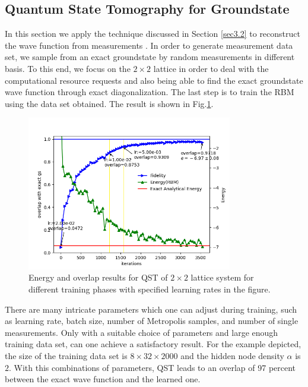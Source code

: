 \documentclass{article}
\begin{document}
\subsection{Quantum State Tomography for Groundstate}\label{sec5.3}

In this section we apply the technique discussed in Section \ref{sec3.2} to reconstruct the wave function from measurements . In order to generate measurement data set, we sample from an exact groundstate by random measurements in different basis. To this end, we focus on the $2 \times 2$ lattice in order to deal with the computational resource requests and also being able to find the exact groundstate wave function through exact diagonalization. The last step is to train the RBM using the data set obtained. The result is shown in Fig.\hspace{0.2mm}\ref{fig:qst}.

\begin{figure}[!htb]
	\centering
	\includegraphics[width=0.8\textwidth]{./images/2x2_16k_1.png}
	\caption{\label{fig:qst} Energy and overlap results for QST of $2 \times 2$ lattice system for different training phases with specified learning rates in the figure.} 
\end{figure}

There are many intricate parameters which one can adjust during training, such as learning rate, batch size, number of Metropolis samples, and number of single measurements. Only with a suitable choice of parameters and large enough training data set, can one achieve a satisfactory result. For the example depicted, the size of the training data set is $8 \times 32 \times 2000$  and the hidden node density $\alpha$ is $2$. With this combinations of parameters, QST leads to an overlap of 97 percent between the exact wave function and the learned one. 
\end{document}
